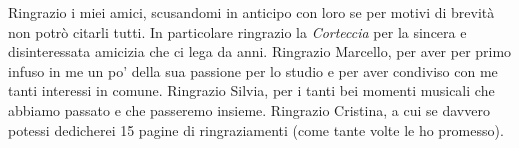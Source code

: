 \documentclass[a4paper,12pt,twoside]{book}
\begin{document}
Ringrazio i miei amici, scusandomi in anticipo con loro se per motivi di brevità non potrò citarli tutti. In particolare ringrazio la \emph{Corteccia} per la sincera e disinteressata amicizia che ci lega da anni. Ringrazio Marcello, per aver per primo infuso in me un po' della sua passione per lo studio e per aver condiviso con me tanti interessi in comune. Ringrazio Silvia, per i tanti bei momenti musicali che abbiamo passato e che passeremo insieme. Ringrazio Cristina, a cui se davvero potessi dedicherei 15 pagine di ringraziamenti (come tante volte le ho promesso).


\tableofcontents

\mainmatter



















\backmatter

\nocite{*}
\printbibliography[heading=bibintoc]		%
\end{document}
